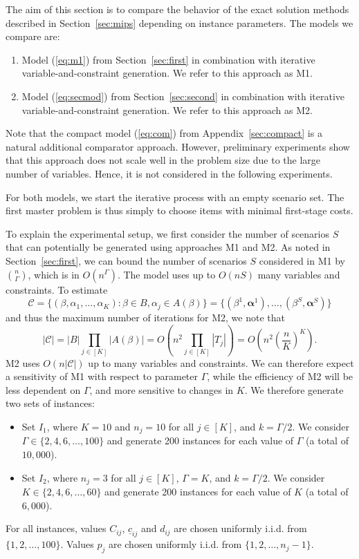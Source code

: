 The aim of this section is to compare the behavior of the exact solution methods described in Section~\ref{sec:mips} depending on instance parameters. The models we compare are:
\begin{enumerate}
\item Model (\ref{eq:m1}) from Section~\ref{sec:first} in combination with iterative variable-and-constraint generation. We refer to this approach as M1.
\item Model (\ref{eq:secmod}) from Section~\ref{sec:second} in combination with iterative variable-and-constraint generation. We refer to this approach as M2.
\end{enumerate}
Note that the compact model (\ref{eq:com}) from Appendix~\ref{sec:compact} is a natural additional comparator approach. However, preliminary experiments show that this approach does not scale well in the problem size due to the large number of variables. Hence, it is not considered in the following experiments.

For both models, we start the iterative process with an empty scenario set. The first master problem is thus simply to choose items with minimal first-stage costs.

To explain the experimental setup, we first consider the number of scenarios $S$ that can potentially be generated using approaches M1 and M2. As noted in Section~\ref{sec:first}, we can bound the number of scenarios $S$ considered in M1 by $\binom{n}{\Gamma}$, which is in $O(n^\Gamma)$. The model uses up to $O(nS)$ many variables and constraints. To estimate
\[ \mathcal{C} = \{ (\beta,\alpha_1,\ldots,\alpha_K) : \beta \in B, \alpha_j \in A(\beta) \} =  \{ (\beta^1,\pmb{\alpha}^1), \ldots, (\beta^S,\pmb{\alpha}^S) \} \]
and thus the maximum number of iterations for M2, we note that
\[ |\mathcal{C}| = |B| \prod_{j\in[K]} |A(\beta)| = O(n^2 \prod_{j\in[K]} |T_j|) = O(n^2\left(\frac{n}{K}\right)^K ). \]
M2 uses $O(n|\mathcal{C}|)$ up to many variables and constraints.
We can therefore expect a sensitivity of M1 with respect to parameter $\Gamma$, while the efficiency of M2 will be less dependent on $\Gamma$, and more sensitive to changes in $K$. We therefore generate two sets of instances:
\begin{itemize}
\item Set $I_1$, where $K=10$ and $n_j=10$ for all $j\in[K]$, and $k=\Gamma/2$. We consider $\Gamma\in \{2,4,6,\ldots,100\}$ and generate 200 instances for each value of $\Gamma$ (a total of $10,000$).

\item Set $I_2$, where $n_j=3$ for all $j\in[K]$, $\Gamma=K$, and $k=\Gamma/2$. We consider $K\in \{2,4,6,\ldots,60\}$ and generate 200 instances for each value of $K$ (a total of $6,000$).
\end{itemize}
For all instances, values $C_{ij}$, $\underline{c}_{ij}$ and $d_{ij}$ are chosen uniformly i.i.d.\! from $\{1,2,\ldots,100\}$. Values $p_j$ are chosen uniformly i.i.d.\! from $\{1,2,\ldots,n_j-1\}$.

